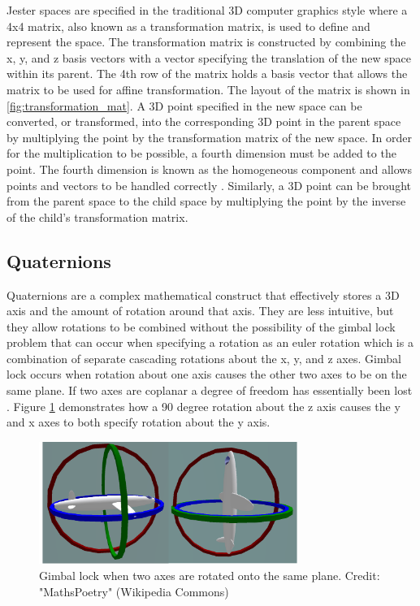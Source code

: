 Jester spaces are specified in the traditional 3D computer graphics style where a 4x4 matrix, also known as a transformation matrix, is used to define and represent the space. The transformation matrix is constructed by combining the x, y, and z basis vectors with a vector specifying the translation of the new space within its parent. The 4th row of the matrix holds a basis vector that allows the matrix to be used for affine transformation. The layout of the matrix is shown in \ref{fig:transformation_mat}. A 3D point specified in the new space can be converted, or transformed, into the corresponding 3D point in the parent space by multiplying the point by the transformation matrix of the new space. In order for the multiplication to be possible, a fourth dimension must be added to the point. The fourth dimension is known as the homogeneous component and allows points and vectors to be handled correctly \cite{roberts1963machine}. Similarly, a 3D point can be brought from the parent space to the child space by multiplying the point by the inverse of the child’s transformation matrix.

\subsection{Quaternions}

Quaternions are a complex mathematical construct that effectively stores a 3D axis and the amount of rotation around that axis. They are less intuitive, but they allow rotations to be combined without the possibility of the gimbal lock problem that can occur when specifying a rotation as an euler rotation which is a combination of separate cascading rotations about the x, y, and z axes. Gimbal lock occurs when rotation about one axis causes the other two axes to be on the same plane. If two axes are coplanar a degree of freedom has essentially been lost \cite{gortler2012foundations}. Figure \ref{fig:gimbal_lock} demonstrates how a 90 degree rotation about the z axis causes the y and x axes to both specify rotation about the y axis.

\begin{figure}[h]
\centering
\includegraphics[width=0.75\textwidth]{figures/gimbals}
\caption{Gimbal lock when two axes are rotated onto the same plane. Credit: "MathsPoetry" (Wikipedia Commons)}
\label{fig:gimbal_lock}
\end{figure}

